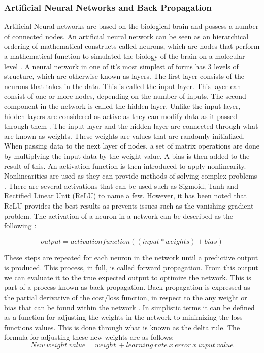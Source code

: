 \subsubsection{Artificial Neural Networks and Back Propagation}
Artificial Neural networks are based on the biological brain and possess a number of connected nodes. An artificial neural network can be seen as an hierarchical ordering of mathematical constructs called neurons, which are nodes that perform a mathematical function to simulated the biology of the brain on a molecular level \citep{muir}.  A neural network in one of it's most simplest of forms has 3 levels of structure, which are otherwise known as layers. The first layer consists of the neurons that takes in the data. This is called the input layer. This layer can consist of one or more nodes, depending on the number of inputs. The second component in the network is called the hidden layer. Unlike the input layer, hidden layers are considered as active as they can modify data as it passed through them \citep{smith_2011}. The input layer and the hidden layer are connected through what are known as weights. These weights are values that are randomly initialized. When passing data to the next layer of nodes, a set of matrix operations are done by multiplying the input data by the weight value. A bias is then added to the result of this. An activation function is then introduced to apply nonlinearity. Nonlinearities are used as they can provide methods of solving complex problems \citep{raschka_2016}. There are several activations that can be used such as Sigmoid, Tanh and Rectified Linear Unit (ReLU) to name a few. However, it has been noted that ReLU provides the best results as prevents issues such as the vanishing gradient problem. The activation of a neuron in a network can be described as the following \citep{collis_2017}:

\begin{equation}\label{eq:act}
output = activation function((input * weights) + bias)
\end{equation}

These steps are repeated for each neuron in the network until a predictive output is produced. This process, in full, is called forward propagation. From this output we can evaluate it to the true expected output to optimize the network. This is part of a process known as back propagation. Back propagation is expressed as the partial derivative of the cost/loss function, in respect to the any weight or bias that can be found within the network \citep{nielsen_2015}. In simplistic terms it can be defined as a function for adjusting the weights in the network to minimizing the loss functions values. This is done through what is known as the delta rule. The formula for adjusting these new weights are as follows:
\begin{equation}\label{eq:act}
New\ weight\ value = weight\ + learning\ rate\ x\ error\ x\ input\ value
\end{equation}

